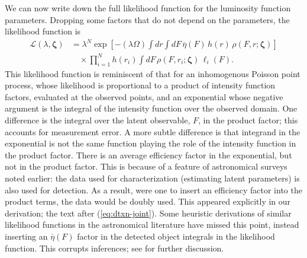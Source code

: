 \documentclass[12pt]{article}
\numberwithin{equation}{section}
\numberwithin{figure}{section}
\numberwithin{table}{section}
\newcommand{\rhopar}{\boldsymbol{\zeta}}
\newcommand{\aeffic}{\overline{\eta}}
\newcommand{\like}{\mathcal{L}}
\begin{document}
We can now write down the full likelihood function for the luminosity function parameters.
Dropping some factors that do not depend on the parameters, the likelihood function is
\begin{equation}\label{eq:like}
\begin{split}
\like(\lambda, \rhopar)
  &= \lambda^N \exp\left[- (\lambda \Omega) \int dr \int dF\,
            \aeffic(F)\, h(r)\, \rho(F,r;\rhopar)\right]\\
  &\quad\times \prod_{i=1}^N h(r_i) \int dF\, \rho(F,r_i;\rhopar)\, \ell_i(F).
\end{split}
\end{equation}
This likelihood function is reminiscent of that for an inhomogenous Poisson point process, whose likelihood is proportional to a product of intensity function factors, evaluated at the observed points, and an exponential whose negative argument is the integral of the intensity function over the observed domain.
One difference is the integral over the latent observable, $F$, in the product factor; this accounts for measurement error.
A more subtle difference is that integrand in the exponential is not the same function playing the role of the intensity function in the product factor.
There is an average efficiency factor in the exponential, but not in the product factor.
This is because of a feature of astronomical surveys noted earlier: the data used for characterization (estimating latent parameters) is also used for detection.
As a result, were one to insert an efficiency factor into the product terms, the data would be doubly used.
This appeared explicitly in our derivation; the text after (\ref{eq:dtxn-joint}).
Some heuristic derivations of similar likelihood functions in the astronomical literature have missed this point, instead inserting an $\aeffic(F)$ factor in the detected object integrals in the likelihood function.
This corrupts inferences; see \cite{L04-MsmtErr} for further discussion.
\end{document}
